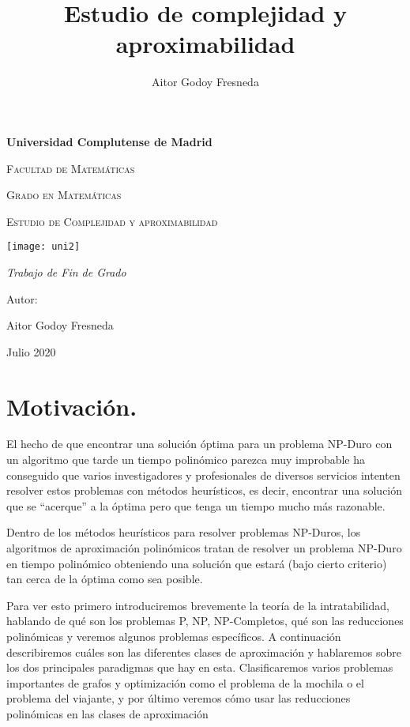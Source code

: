 \documentclass[a4paper,12pt,titlepage]{article}
\title{Estudio de complejidad y aproximabilidad}
\author{Aitor Godoy Fresneda}
\begin{document}
\begin{titlepage}
  \centering
  {\bfseries\LARGE Universidad Complutense de Madrid \par}
  \vspace{1cm}
  {\scshape\Large Facultad de Matemáticas \par}
  {\scshape\Large Grado en Matem\'aticas \par}
  \vspace{2cm}
  {\scshape\Huge Estudio de Complejidad y aproximabilidad \par}
  \vspace{2cm}
  {\texttt{[image: uni2]}\par}
  \vspace{1cm}
  {\itshape\Large Trabajo de Fin de Grado \par}
  \vfill
  {\Large Autor: \par}
  {\Large Aitor Godoy Fresneda \par}
  \vfill
  {\Large Julio 2020 \par}
\end{titlepage}

\tableofcontents

\newpage

\section{Motivaci\'on.}\label{sec:motivacion}

El hecho de que encontrar una soluci\'on \'optima para un problema NP-Duro con un algoritmo que tarde un tiempo polin\'omico parezca muy improbable ha conseguido que varios investigadores y profesionales de diversos servicios intenten resolver estos problemas con m\'etodos heur\'isticos, es decir, encontrar una soluci\'on que se ``acerque'' a la \'optima pero que tenga un tiempo mucho m\'as razonable.

Dentro de los m\'etodos heur\'isticos para resolver problemas NP-Duros, los algoritmos de aproximaci\'on polin\'omicos tratan de resolver un problema NP-Duro en tiempo polin\'omico obteniendo una soluci\'on que estar\'a (bajo cierto criterio) tan cerca de la \'optima como sea posible.

Para ver esto primero introduciremos brevemente la teor\'ia de la intratabilidad, hablando de qu\'e son los problemas P, NP, NP-Completos, qu\'e son las reducciones polin\'omicas y veremos algunos problemas espec\'ificos. A continuaci\'on describiremos cu\'ales son las diferentes clases de aproximaci\'on y hablaremos sobre los dos principales paradigmas que hay en esta. Clasificaremos varios problemas importantes de grafos y optimizaci\'on como el problema de la mochila o el problema del viajante, y por \'ultimo veremos c\'omo usar las reducciones polin\'omicas en las clases de aproximaci\'on \cite{approx_core}
\end{document}
